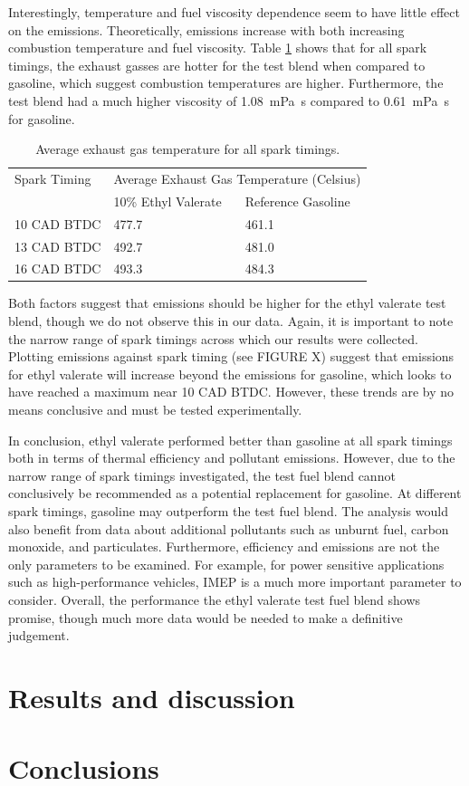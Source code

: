 \documentclass[11pt]{article}
\begin{document}
Interestingly, temperature and fuel viscosity dependence seem to have little effect on the  emissions. Theoretically,  emissions increase with both increasing combustion temperature and fuel viscosity. Table \ref{q7-t1} shows that for all spark timings, the exhaust gasses are hotter for the test blend when compared to gasoline, which suggest combustion temperatures are higher. Furthermore, the test blend had a much higher viscosity of \SI{1.08}{\milli\pascal\second} compared to \SI{0.61}{\milli\pascal\second} for gasoline. 
\begin{table}[H]
	\begin{center}
	\begin{tabular}{@{}lll@{}}
		\toprule
		Spark Timing & \multicolumn{2}{c}{Average Exhaust Gas Temperature (Celsius)} \\
		\cmidrule{2-3} & 10\% Ethyl Valerate & Reference Gasoline \\
		\midrule
		10 CAD BTDC & 477.7 & 461.1 \\
		13 CAD BTDC & 492.7 & 481.0 \\
		16 CAD BTDC & 493.3 & 484.3 \\
		\bottomrule
	\end{tabular}
	\caption{Average exhaust gas temperature for all spark timings.}
	\label{q7-t1}
	\end{center}
\end{table}
Both factors suggest that  emissions should be higher for the ethyl valerate test blend, though we do not observe this in our data. Again, it is important to note the narrow range of spark timings across which our results were collected. Plotting  emissions against spark timing (see FIGURE X) suggest that  emissions for ethyl valerate will increase beyond the  emissions for gasoline, which looks to have reached a maximum near 10 CAD BTDC. However, these trends are by no means conclusive and must be tested experimentally.

In conclusion, ethyl valerate performed better than gasoline at all spark timings both in terms of thermal efficiency and pollutant emissions. However, due to the narrow range of spark timings investigated, the test fuel blend cannot conclusively be recommended as a potential replacement for gasoline. At different spark timings, gasoline may outperform the test fuel blend. The analysis would also benefit from data about additional pollutants such as unburnt fuel, carbon monoxide, and particulates. Furthermore, efficiency and emissions are not the only parameters to be examined. For example, for power sensitive applications such as high-performance vehicles, IMEP is a much more important parameter to consider. Overall, the performance the ethyl valerate test fuel blend shows promise, though much more data would be needed to make a definitive judgement. 
\section*{Results and discussion}
\section*{Conclusions}
\begin{thebibliography}{00}

\end{thebibliography}
\end{document}
